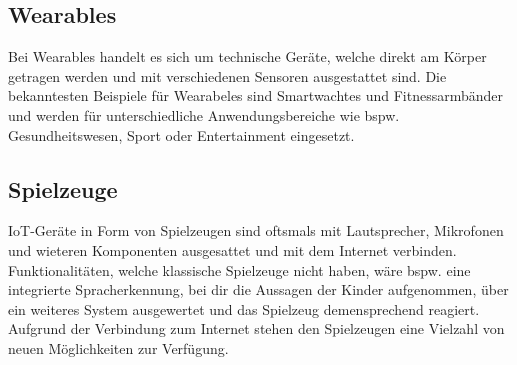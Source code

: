 \subsection{Wearables}
Bei Wearables handelt es sich um technische Geräte, welche direkt am Körper getragen werden und mit verschiedenen 
Sensoren ausgestattet sind. Die bekanntesten Beispiele für Wearabeles sind Smartwachtes und Fitnessarmbänder und 
werden für unterschiedliche Anwendungsbereiche wie bspw. Gesundheitswesen, Sport oder Entertainment eingesetzt.


\subsection{Spielzeuge}
IoT-Geräte in Form von Spielzeugen sind oftsmals mit Lautsprecher, Mikrofonen und wieteren Komponenten ausgesattet
und mit dem Internet verbinden. Funktionalitäten, welche klassische Spielzeuge nicht haben, wäre bspw. eine integrierte
Spracherkennung, bei dir die Aussagen der Kinder aufgenommen, über ein weiteres System ausgewertet und das Spielzeug
demensprechend reagiert. Aufgrund der Verbindung zum Internet stehen den Spielzeugen eine Vielzahl von neuen Möglichkeiten
zur Verfügung.